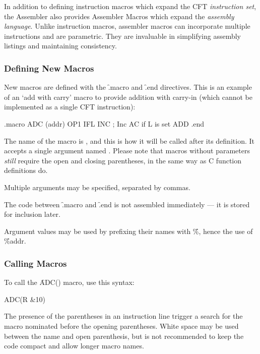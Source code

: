 In addition to defining instruction macros which expand the CFT {\em
  instruction set}, the Assembler also provides Assembler Macros which expand
the {\em assembly language}. Unlike instruction macros, assembler macros can
incorporate multiple instructions and are parametric. They are invaluable in
simplifying assembly listings and maintaining consistency.

\subsubsection{Defining New Macros}

New macros are defined with the \f{.macro} and \f{.end} directives. This is an
example of an ‘add with carry’ macro to provide addition with carry-in (which
cannot be implemented as a single CFT instruction):

\begin{cftasmcode}
.macro ADC (addr)
    OP1 IFL INC    ; Inc AC if L is set
    ADD %
.end
\end{cftasmcode}

The name of the macro is , and this is how it will be called after its
definition. It accepts a single argument named . Please note that
macros without parameters {\em still} require the open and closing parentheses,
in the same way as C function definitions do.

Multiple arguments may be specified, separated by commas.

The code between \f{.macro} and \f{.end} is not assembled immediately — it is
stored for inclusion later.

Argument values may be used by prefixing their names with \f{\%}, hence the use
of \f{\%addr}.

\subsubsection{Calling Macros}

To call the \f{ADC()} macro, use this syntax:

\begin{cftasmcode}
ADC(R &10)
\end{cftasmcode}

The presence of the parentheses in an instruction line trigger a search for the
macro nominated before the opening parentheses. White space may be used between
the name and open parenthesis, but is not recommended to keep the code compact
and allow longer macro names.

